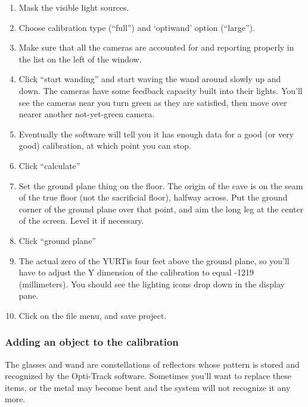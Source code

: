 \documentclass[11pt]{article}
\newcommand{\yurt}{YURT}
\begin{document}
\begin{enumerate}

\item Mask the visible light sources.

\item Choose calibration type (``full'') and `optiwand' option
  (``large''). 

\item Make sure that all the cameras are accounted for and reporting
  properly in the list on the left of the window.

\item Click ``start wanding'' and start waving the wand around slowly
  up and down.  The cameras have some feedback capacity built into
  their lights.  You'll see the cameras near you turn green as they
  are satisfied, then move over nearer another not-yet-green camera.

\item Eventually the software will tell you it has enough data for a
  good (or very good) calibration, at which point you can stop.

\item Click ``calculate''

\item Set the ground plane thing on the floor.  The origin of the cave is on
  the seam of the true floor (not the sacrificial floor), halfway
  across.  Put the ground corner of the ground plane over that point,
  and aim the long leg at the center of the screen.  Level it if
  necessary.

\item Click ``ground plane''

\item The actual zero of the \yurt is four feet above the ground plane,
  so you'll have to adjust the Y dimension of the calibration to equal
  -1219 (millimeters).  You should see the lighting icons drop down in
  the display pane.

\item Click on the file menu, and save project.

\end{enumerate}


\subsubsection{Adding an object to the calibration}

The glasses and wand are constellations of reflectors whose pattern is
stored and recognized by the Opti-Track software.  Sometimes you'll
want to replace these items, or the metal may become bent and the
system will not recognize it any more.
\end{document}
